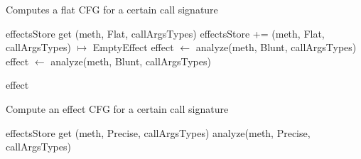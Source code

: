 \documentclass[a4paper]{article}
\begin{document}
\begin{algorithm}
\caption{Computes a flat CFG for a certain call signature}\label{algo:pt:getflatcfg}
\begin{algorithmic}[1]
        \State \Return effectsStore get (meth, Flat, callArgsTypes)
    \Else
        \State effectsStore += (meth, Flat, callArgsTypes) $\mapsto$ EmptyEffect
        \State effect $\gets$ analyze(meth, Blunt, callArgsTypes)
        \Repeat
            \State effect $\gets$ analyze(meth, Blunt, callArgsTypes)

        \State \Return effect
    \EndIf
\EndFunction
\end{algorithmic}
\end{algorithm}

\begin{algorithm}
\caption{Compute an effect CFG for a certain call signature}\label{algo:pt:getanalyzedcfg}
\begin{algorithmic}[1]
        \State \Return effectsStore get (meth, Precise, callArgsTypes)
    \Else
        \State \Return analyze(meth, Precise, callArgsTypes)
    \EndIf
\EndFunction
\end{algorithmic}
\end{algorithm}
\end{document}
